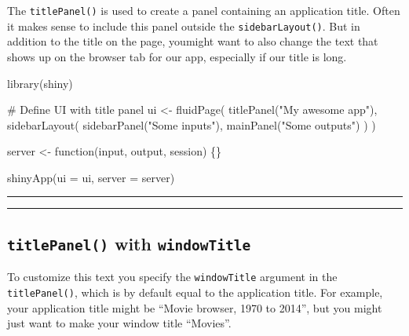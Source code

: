 \documentclass[
  letterpaper,
  DIV=11,
  numbers=noendperiod]{scrreprt}
\newenvironment{Shaded}{\begin{snugshade}}{\end{snugshade}}
\newcommand{\AttributeTok}[1]{\textcolor[rgb]{0.40,0.46,0.14}{#1}}
\newcommand{\CommentTok}[1]{\textcolor[rgb]{0.37,0.37,0.37}{#1}}
\newcommand{\ControlFlowTok}[1]{\textcolor[rgb]{0.00,0.46,0.62}{#1}}
\newcommand{\FunctionTok}[1]{\textcolor[rgb]{0.28,0.35,0.67}{#1}}
\newcommand{\NormalTok}[1]{\textcolor[rgb]{0.00,0.46,0.62}{#1}}
\newcommand{\OtherTok}[1]{\textcolor[rgb]{0.00,0.46,0.62}{#1}}
\newcommand{\StringTok}[1]{\textcolor[rgb]{0.13,0.47,0.30}{#1}}
\begin{document}
The \texttt{titlePanel()} is used to create a panel containing an
application title. Often it makes sense to include this panel outside
the \texttt{sidebarLayout()}. But in addition to the title on the page,
youmight want to also change the text that shows up on the browser tab
for our app, especially if our title is long.

\begin{Shaded}
\begin{Highlighting}[]
\FunctionTok{library}\NormalTok{(shiny)}

\CommentTok{\# Define UI with title panel}
\NormalTok{ui }\OtherTok{\textless{}{-}} \FunctionTok{fluidPage}\NormalTok{(}
  \FunctionTok{titlePanel}\NormalTok{(}\StringTok{"My awesome app"}\NormalTok{),}
  \FunctionTok{sidebarLayout}\NormalTok{(}
    \FunctionTok{sidebarPanel}\NormalTok{(}\StringTok{"Some inputs"}\NormalTok{),}
    \FunctionTok{mainPanel}\NormalTok{(}\StringTok{"Some outputs"}\NormalTok{)}
\NormalTok{  )}
\NormalTok{)}

\NormalTok{server }\OtherTok{\textless{}{-}} \ControlFlowTok{function}\NormalTok{(input, output, session) \{\}}

\FunctionTok{shinyApp}\NormalTok{(}\AttributeTok{ui =}\NormalTok{ ui, }\AttributeTok{server =}\NormalTok{ server)}
\end{Highlighting}
\end{Shaded}

\begin{center}\rule{0.5\linewidth}{0.5pt}\end{center}

\begin{center}\rule{0.5\linewidth}{0.5pt}\end{center}

\hypertarget{titlepanel-with-windowtitle}{%
\subsection{\texorpdfstring{\texttt{titlePanel()} with
\texttt{windowTitle}}{titlePanel() with windowTitle}}\label{titlepanel-with-windowtitle}}

To customize this text you specify the \texttt{windowTitle} argument in
the \texttt{titlePanel()}, which is by default equal to the application
title. For example, your application title might be ``Movie browser,
1970 to 2014'', but you might just want to make your window title
``Movies''.
\end{document}
